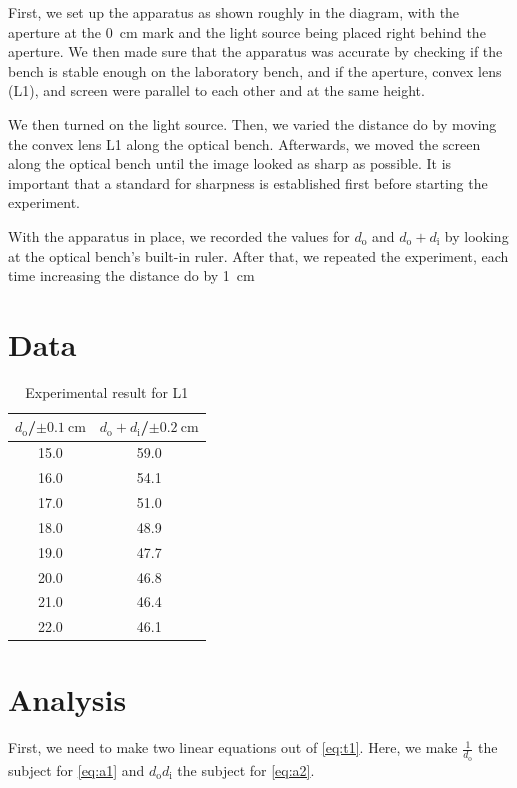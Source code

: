 \documentclass[letter,12pt]{article}
\numberwithin{equation}{section}
\numberwithin{figure}{section}
\numberwithin{table}{section}
\newcommand{\dist}[1] {\(d_{\mathrm{#1}}\)}
\newcommand{\mdist}[1] {d_{\mathrm{#1}}}
\begin{document}
First, we set up the apparatus as shown roughly in the diagram, with the aperture at the \SI{0}{\cm} mark and the light source being placed right behind the aperture. We then made sure that the apparatus was accurate by checking if the bench is stable enough on the laboratory bench, and if the aperture, convex lens (L1), and screen were parallel to each other and at the same height. 

We then turned on the light source. Then, we varied the distance do by moving the convex lens L1 along the optical bench. Afterwards, we moved the screen along the optical bench until the image looked as sharp as possible. It is important that a standard for sharpness is established first before starting the experiment.

With the apparatus in place, we recorded the values for \dist{o} and \(\mdist{o} + \mdist{i}\) by looking at the optical bench’s built-in ruler. After that, we repeated the experiment, each time increasing the distance do by \SI{1}{\cm}

\pagebreak[4]
\section{Data}
\begin{table}[!ht]
  \centering
  \begin{tabular}{cc}
    \toprule
    {\(\mdist{o}\)/\(\pm \SI{0.1}{\cm}\)} & {\(\mdist{o} + \mdist{i}\)/\(\pm \SI{0.2}{\cm}\)} \\
    \midrule
    15.0 & 59.0 \\
    16.0 & 54.1 \\
    17.0 & 51.0 \\
    18.0 & 48.9 \\
    19.0 & 47.7 \\
    20.0 & 46.8 \\
    21.0 & 46.4 \\
    22.0 & 46.1 \\
    \bottomrule
  \end{tabular}
  \caption{Experimental result for L1}
  \label{table:d1}
\end{table}

\section{Analysis}
First, we need to make two linear equations out of \eqref{eq:t1}. Here, we make \(\frac{1}{\mdist{o}}\) the subject for \eqref{eq:a1} and \(\mdist{o} \mdist{i}\) the subject for \eqref{eq:a2}.
\end{document}
